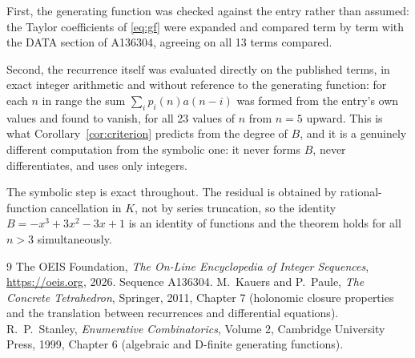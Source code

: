 \documentclass[11pt,a4paper]{article}
\theoremstyle{plain}
\theoremstyle{definition}
\begin{document}
First, the generating function was checked against the entry rather than assumed: the
Taylor coefficients of \eqref{eq:gf} were expanded and compared term by term with the DATA
section of A136304, agreeing on all 13 terms compared.

Second, the recurrence itself was evaluated directly on the published terms, in exact
integer arithmetic and without reference to the generating function: for each $n$ in range
the sum $\sum_{i}p_{i}(n)a(n-i)$ was formed from the entry's own values and found to
vanish, for all 23 values of $n$ from $n=5$ upward. This is what
Corollary~\ref{cor:criterion} predicts from the degree of $B$, and it is a genuinely
different computation from the symbolic one: it never forms $B$, never differentiates, and
uses only integers.

The symbolic step is exact throughout. The residual is obtained by rational-function
cancellation in $K$, not by series truncation, so the identity $B=- x^{3} + 3 x^{2} - 3 x + 1$ is an
identity of functions and the theorem holds for all $n>3$ simultaneously.

\begin{thebibliography}{9}
 The OEIS Foundation, \emph{The On-Line Encyclopedia of Integer Sequences},
\url{https://oeis.org}, 2026. Sequence A136304.
 M.~Kauers and P.~Paule, \emph{The Concrete Tetrahedron}, Springer, 2011,
Chapter 7 (holonomic closure properties and the translation between recurrences and
differential equations).
 R.~P.~Stanley, \emph{Enumerative Combinatorics}, Volume 2, Cambridge
University Press, 1999, Chapter 6 (algebraic and D-finite generating functions).
\end{thebibliography}
\end{document}
